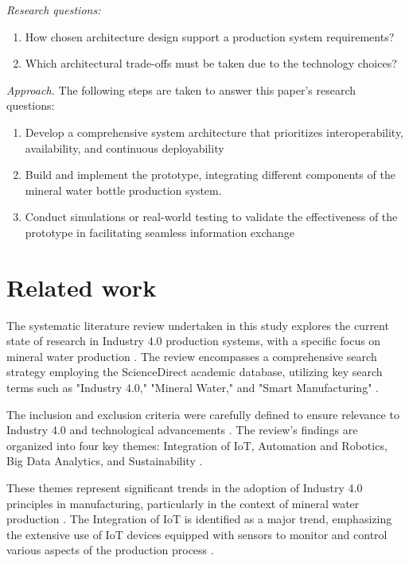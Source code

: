\documentclass[conference]{IEEEtran}
\begin{document}
\newblock 

\emph{Research questions:}
\begin{enumerate}
    \item How chosen architecture design support a production system requirements?
    \item Which architectural trade-offs must be taken due to the technology choices? 
\end{enumerate}

\newblock 

\emph{Approach.}
The following steps are taken to answer this paper's research questions: 
\begin{enumerate}
    \item Develop a comprehensive system architecture that prioritizes interoperability, availability, and continuous deployability
    \item Build and implement the prototype, integrating different components of the mineral water bottle production system.
    \item Conduct simulations or real-world testing to validate the effectiveness of the prototype in facilitating seamless information exchange
\end{enumerate}

\newblock 

\section{Related work}
\label{sec:related_work}


The systematic literature review undertaken in this study explores the current state of research in Industry 4.0 production systems, with a specific focus on mineral water production \cite{Ali2023}. The review encompasses a comprehensive search strategy employing the ScienceDirect academic database, utilizing key search terms such as "Industry 4.0," "Mineral Water," and "Smart Manufacturing" \cite{Soori2023}.

The inclusion and exclusion criteria were carefully defined to ensure relevance to Industry 4.0 and technological advancements \cite{Soori2023}. The review's findings are organized into four key themes: Integration of IoT, Automation and Robotics, Big Data Analytics, and Sustainability \cite{Soori2023}.

These themes represent significant trends in the adoption of Industry 4.0 principles in manufacturing, particularly in the context of mineral water production \cite{Ali2023} \cite{Morgan2021}. The Integration of IoT is identified as a major trend, emphasizing the extensive use of IoT devices equipped with sensors to monitor and control various aspects of the production process \cite{Soori2023}.
\end{document}

